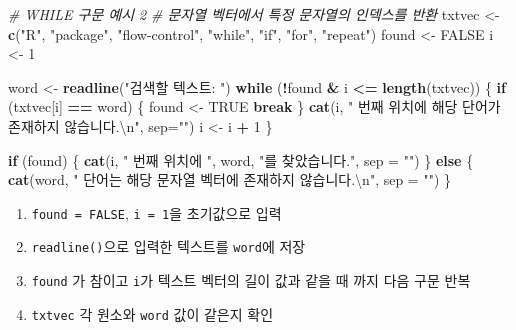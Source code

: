 \documentclass[
  11pt,
]{krantz}
\makeatletter
\newenvironment{Shaded}{\begin{snugshade}}{\end{snugshade}}
\newcommand{\CharTok}[1]{\textcolor[rgb]{0.5,0.5,0.5}{#1}}
\newcommand{\CommentTok}[1]{\textcolor[rgb]{0.37,0.37,0.37}{\textit{#1}}}
\newcommand{\ControlFlowTok}[1]{\textcolor[rgb]{0.27,0.27,0.27}{\textbf{#1}}}
\newcommand{\DataTypeTok}[1]{\textcolor[rgb]{0.27,0.27,0.27}{#1}}
\newcommand{\DecValTok}[1]{\textcolor[rgb]{0.06,0.06,0.06}{#1}}
\newcommand{\KeywordTok}[1]{\textcolor[rgb]{0.27,0.27,0.27}{\textbf{#1}}}
\newcommand{\NormalTok}[1]{#1}
\newcommand{\OperatorTok}[1]{\textcolor[rgb]{0.43,0.43,0.43}{\textbf{#1}}}
\newcommand{\OtherTok}[1]{\textcolor[rgb]{0.37,0.37,0.37}{#1}}
\newcommand{\StringTok}[1]{\textcolor[rgb]{0.5,0.5,0.5}{#1}}
\providecommand{\tightlist}{%
  \setlength{\itemsep}{0pt}\setlength{\parskip}{0pt}}
\newenvironment{kframe}{%
\medskip{}
\setlength{\fboxsep}{.8em}
 \def\at@end@of@kframe{}%
 \ifinner\ifhmode%
  \def\at@end@of@kframe{\end{minipage}}%
  \begin{minipage}{\columnwidth}%
 \fi\fi%
 \def\FrameCommand##1{\hskip\@totalleftmargin \hskip-\fboxsep
 \colorbox{shadecolor}{##1}\hskip-\fboxsep
     \hskip-\linewidth \hskip-\@totalleftmargin \hskip\columnwidth}%
 \MakeFramed {\advance\hsize-\width
   \@totalleftmargin\z@ \linewidth\hsize
   \@setminipage}}%
 {\par\unskip\endMakeFramed%
 \at@end@of@kframe}
\renewenvironment{quote}{\begin{kframe}}{\end{kframe}}
\makeatother
\begin{document}
\begin{Shaded}
\begin{Highlighting}[]
\CommentTok{# WHILE 구문 예시 2}
\CommentTok{# 문자열 벡터에서 특정 문자열의 인덱스를 반환}
\NormalTok{txtvec <-}\StringTok{ }\KeywordTok{c}\NormalTok{(}\StringTok{"R"}\NormalTok{, }\StringTok{"package"}\NormalTok{, }\StringTok{"flow-control"}\NormalTok{, }\StringTok{"while"}\NormalTok{, }\StringTok{"if"}\NormalTok{, }\StringTok{"for"}\NormalTok{, }\StringTok{"repeat"}\NormalTok{)}
\NormalTok{found <-}\StringTok{ }\OtherTok{FALSE}
\NormalTok{i <-}\StringTok{ }\DecValTok{1}

\NormalTok{word <-}\StringTok{ }\KeywordTok{readline}\NormalTok{(}\StringTok{"검색할 텍스트: "}\NormalTok{)}
\ControlFlowTok{while}\NormalTok{ (}\OperatorTok{!}\NormalTok{found }\OperatorTok{&}\StringTok{ }\NormalTok{i }\OperatorTok{<=}\StringTok{ }\KeywordTok{length}\NormalTok{(txtvec)) \{}
  \ControlFlowTok{if}\NormalTok{ (txtvec[i] }\OperatorTok{==}\StringTok{ }\NormalTok{word) \{}
\NormalTok{    found <-}\StringTok{ }\OtherTok{TRUE}
    \ControlFlowTok{break}
\NormalTok{  \}}
  \KeywordTok{cat}\NormalTok{(i, }\StringTok{" 번째 위치에 해당 단어가 존재하지 않습니다.}\CharTok{\textbackslash{}n}\StringTok{"}\NormalTok{, }\DataTypeTok{sep=}\StringTok{""}\NormalTok{)}
\NormalTok{  i <-}\StringTok{ }\NormalTok{i }\OperatorTok{+}\StringTok{ }\DecValTok{1}
\NormalTok{\}}

\ControlFlowTok{if}\NormalTok{ (found) \{}
  \KeywordTok{cat}\NormalTok{(i, }\StringTok{" 번째 위치에 "}\NormalTok{, word, }\StringTok{"를 찾았습니다."}\NormalTok{, }\DataTypeTok{sep =} \StringTok{""}\NormalTok{)}
\NormalTok{\} }\ControlFlowTok{else}\NormalTok{ \{}
  \KeywordTok{cat}\NormalTok{(word, }\StringTok{" 단어는 해당 문자열 벡터에 존재하지 않습니다.}\CharTok{\textbackslash{}n}\StringTok{"}\NormalTok{, }\DataTypeTok{sep =} \StringTok{""}\NormalTok{)}
\NormalTok{\}}
\end{Highlighting}
\end{Shaded}

\normalsize

\begin{quote}
\begin{enumerate}
\def\labelenumi{\arabic{enumi}.}
\tightlist
\item
  \texttt{found\ =\ FALSE}, \texttt{i\ =\ 1}을 초기값으로 입력
\item
  \texttt{readline()}으로 입력한 텍스트를 \texttt{word}에 저장
\item
  \texttt{found} 가 참이고 \texttt{i}가 텍스트 벡터의 길이 값과 같을 때 까지 다음 구문 반복
\item
  \texttt{txtvec} 각 원소와 \texttt{word} 값이 같은지 확인
\end{enumerate}
\end{quote}
\end{document}
